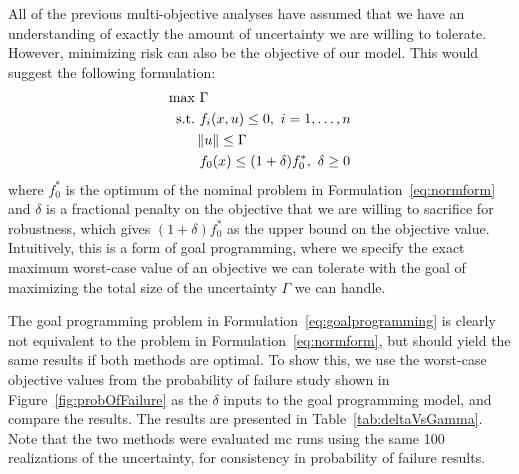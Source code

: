 All of the previous multi-objective analyses have assumed that we have an
understanding of exactly the amount of uncertainty we are
willing to tolerate. However, minimizing risk can also be the objective of our
model. This would suggest the following formulation:
\begin{equation}
    \begin{split}
    \text{max} &~\Gamma \\
    \text{s.t.}     &~f_i(x,u) \leq 0,~i = 1,\ldots,n \\
                    & \left\lVert u\right\rVert \leq \Gamma \\
                    &~f_0(x) \leq (1+\delta)f_0^*,~\delta \geq 0
    \end{split}
    \label{eq:goalprogramming}
\end{equation}
where $f_0^*$ is the optimum of the nominal problem in Formulation~\ref{eq:normform} and $\delta$
is a fractional penalty on the objective that we are willing to sacrifice for robustness, which
gives $(1+\delta)f_0^*$ as the upper bound on the objective value. Intuitively,
this is a form of goal programming,
where we specify the exact maximum worst-case value of an objective we can tolerate with
the goal of maximizing the total size of the uncertainty $\Gamma$ we can handle.

The goal programming problem in Formulation~\ref{eq:goalprogramming} is clearly
not equivalent to the problem in Formulation~\ref{eq:normform},
but should yield the same results if both methods are optimal.
To show this, we use the worst-case objective values from the probability of failure study
shown in Figure~\ref{fig:probOfFailure} as the $\delta$ inputs to the goal programming model, and compare the results.
The results are presented in
Table~\ref{tab:deltaVsGamma}. Note that the two methods were evaluated \gls{mc} runs using the same 100 realizations
of the uncertainty, for consistency in probability of failure results.

